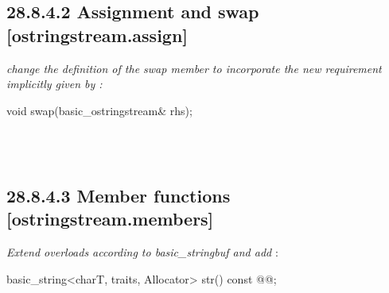 \documentclass[ebook,11pt,article]{memoir}
\begin{document}
\subsection{28.8.4.2 Assignment and swap [ostringstream.assign]}
\textit{change the definition of the swap member to incorporate the new requirement implicitly given by :}

%
\begin{itemdecl}
void swap(basic_ostringstream& rhs);
\end{itemdecl}

\begin{itemdescr}
\pnum
\effects {}
\\
\added{\tcode{;}}\\
\added{\tcode{;}}
\end{itemdescr}


\subsection{28.8.4.3 Member functions [ostringstream.members]}
\textit{Extend  overloads according to basic_stringbuf and add }:

%
\begin{itemdecl}
basic_string<charT, traits, Allocator> str() const @\added{\&}@;
\end{itemdecl}

\begin{itemdescr}
\pnum
\removed{\returns}
\added{\tcode{;}}
\end{itemdescr}
\end{document}
